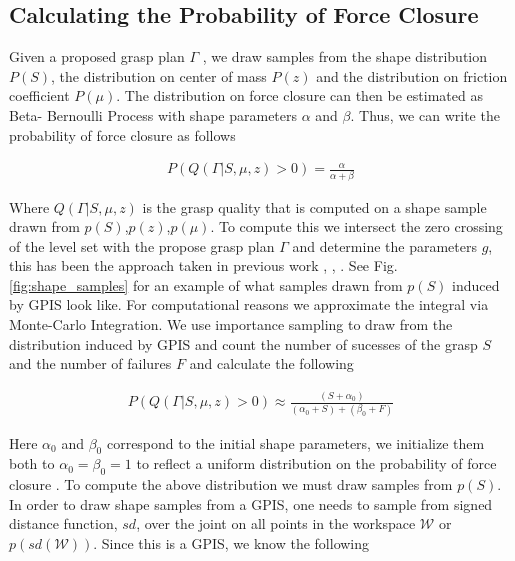 \documentclass[letterpaper, 10 pt, conference]{ieeeconf}  %
\begin{document}
\subsection{Calculating the Probability of Force Closure}
Given a proposed grasp plan $\Gamma$ , we draw samples from the shape distribution $P (S )$, the distribution on center of mass $P (z)$ and the distribution on friction coefficient $P (\mu)$. The distribution on force closure can then be estimated as Beta- Bernoulli Process with shape parameters $\alpha$ and $\beta$. Thus, we can write the probability of force closure as follows


\vspace{-2ex}
\begin{align}\label{eq:shape_sampling}
P(Q(\Gamma|S,\mu,z) > 0) = \frac{\alpha}{\alpha + \beta}
\end{align}



Where $Q(\Gamma|S,\mu,z)$ is the grasp quality that is computed on a shape sample drawn from $p(S)$,$p(z)$,$p(\mu)$. To compute this we intersect the zero crossing of the level set with the propose grasp plan $\Gamma$ and determine the parameters $g$, this has been the approach taken in previous work  \cite{kehoe2012estimating}, \cite{kehoe2012toward},  \cite{christopoulos2007handling}. See Fig. \ref{fig:shape_samples} for an example of what samples drawn from $p(S)$ induced by GPIS look like. For computational reasons we approximate the integral via Monte-Carlo Integration. We use importance sampling to draw from the distribution induced by GPIS and  count the number of sucesses of the grasp $S$ and the number of failures $F$ and calculate the following



\vspace{-2ex}
\begin{align}\label{eq:shape_sampling}
P(Q(\Gamma|S,\mu,z) > 0) \approx \frac{(S + \alpha_0)}{(\alpha_0 + S) +( \beta_0 + F)}
\end{align}

Here $\alpha_0$ and $\beta_0$ correspond to the initial shape parameters, we initialize them both to $\alpha_0 = \beta_0 = 1$ to reflect a uniform distribution on the probability of force closure . To compute the above distribution we must draw samples from $p(S)$. In order to draw shape samples from a GPIS, one needs to sample from signed distance function, $sd$, over the joint on all points in the workspace $\mathcal{W}$ or $p(sd(\mathcal{W}))$. Since this is a GPIS, we know the following 
\end{document}
